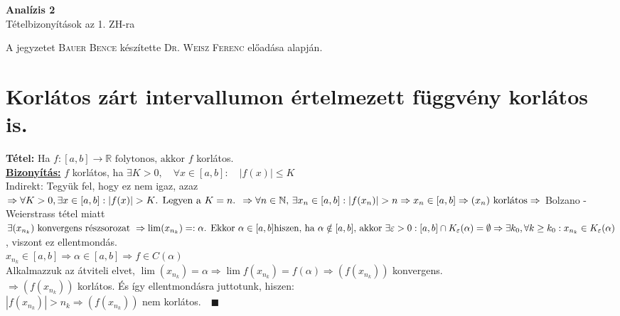 \documentclass[a4paper,12pt]{article}
\begin{document}
	\def\Z{\mathbb{Z}}
	\def\R{\mathbb{R}}
	\def\N{\mathbb{N}}
	\def\sume{\displaystyle\sum_{n=1}^{\infty}}
	\def\sumn{\displaystyle\sum_{n=0}^{\infty}}
	\def\sumeu{\displaystyle\sum_{n=1}}
	\def\sumun{\displaystyle\sum_{n=0}}
	\def\cab{\in C[a,b]}
	\def\dab{\in \D(a,b)}
	\def\biz{\normalsize{\textbf{\underline{Bizonyítás:} }\hspace*{0.5cm}}}
	\def\tetel{\normalsize \textbf{Tétel: }}
	\def\limn{\displaystyle\lim_{n\to +\infty}}
	\def\limh{\displaystyle\lim_{h\to0}}
	\def\limxa{\displaystyle\lim_{x\to a}}
	\def\limxatelj{\displaystyle\lim_{x\to a}\frac{f(x)-f(a)}{x-a}}
	\def\rtr{\displaystyle\R\to\R}
	\def\D{\displaystyle\mathcal{D}}
	\def\lima{\displaystyle\lim_{a}}
	\def\bizva{\quad\blacksquare}
	\def\fda{f\in\D(a)}
	
\begin{center}
	{\LARGE \textbf{Analízis 2}}\\[0.2cm]
	{\large Tételbizonyítások az 1. ZH-ra}
\end{center}
{\small A jegyzetet \textsc{Bauer Bence} készítette \textsc{Dr. Weisz Ferenc} előadása alapján.}
\section{Korlátos zárt intervallumon értelmezett függvény korlátos is.}
\tetel Ha $f:[a,b]\to\R \text{ folytonos, akkor } f $ korlátos. \\[0.1cm]	
\biz $f$ korlátos, ha $\exists K>0, \quad \forall x \in [a,b]: \quad |f(x)|\leq K$ \\[0.1cm]
Indirekt: Tegyük fel, hogy ez nem igaz, azaz\\[0.2cm]	
$\Rightarrow \forall K>0,\exists x \in[a,b]:|f(x)|> K\text{. Legyen a }K=n\text{. } 
\Rightarrow\forall n\in\N\text{, }\exists x_n\in[a,b]:|f(x_n)|>n\\[0.1cm] 
\Rightarrow x_n\in[a,b]\Rightarrow(x_n)\text{ korlátos}\Rightarrow$ Bolzano -
Weierstrass tétel miatt \\[0.1cm] $\exists(x_{n_k})\text{ konvergens részsorozat }
\Rightarrow\lim(x_{n_k})=:\alpha\text{. Ekkor }\alpha\in[a,b]\\[0.1cm]
\text{hiszen, ha }\alpha\notin[a,b]\text{, akkor }\exists\varepsilon>0:[a,b]\cap
K_\varepsilon(\alpha)=\emptyset\\[0.1cm]\Rightarrow\exists k_0,\forall k\geq k_0:
x_{n_k}\in K_\varepsilon(\alpha)$, viszont ez ellentmondás. \\[0.1cm]$x_{n_k}\in
[a,b]\Rightarrow\alpha\in[a,b]\Rightarrow f\in C(\alpha)$\\[0.1cm] Alkalmazzuk az
átviteli elvet, $\lim(x_{n_k})=\alpha\Rightarrow\lim f(x_{n_k})=f(\alpha)
\Rightarrow(f (x_{n_k}))$ konvergens. \\[0.1cm] $\Rightarrow(f (x_{n_k}))$
korlátos. És így ellentmondásra juttotunk, hiszen: \\[0.1cm] $|f(x_{n_k})|>n_k
\Rightarrow(f (x_{n_k}))$ nem korlátos.$\bizva$
\end{document}
